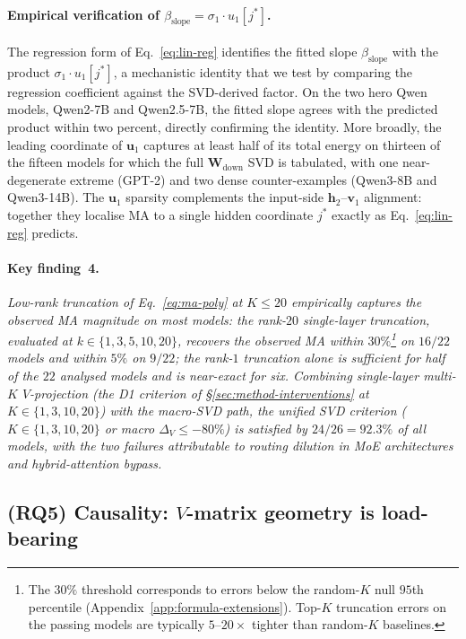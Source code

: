 \documentclass{article}
\newcommand{\Wdown}{\mathbf{W}_{\text{down}}}
\begin{document}
\paragraph{Empirical verification of $\beta_{\text{slope}} = \sigma_1 \cdot u_1[j^{*}]$.}
The regression form of Eq.~\eqref{eq:lin-reg} identifies the fitted
slope $\beta_{\text{slope}}$ with the product $\sigma_1 \cdot u_1[j^{*}]$,
a mechanistic identity that we test by comparing the regression coefficient against
the SVD-derived factor. On the two hero Qwen models, Qwen2-7B and
Qwen2.5-7B, the fitted slope agrees with the predicted product within
two percent, directly confirming the identity. More broadly, the
leading coordinate of $\mathbf{u}_1$ captures at least half of its
total energy on thirteen of the fifteen models for which the full
$\Wdown$ SVD is tabulated, with one near-degenerate extreme (GPT-2)
and two dense counter-examples (Qwen3-8B and Qwen3-14B).
The $\mathbf{u}_1$ sparsity complements the input-side
$\mathbf{h}_2$--$\mathbf{v}_1$ alignment: together they localise MA to
a single hidden coordinate $j^{*}$ exactly as Eq.~\eqref{eq:lin-reg}
predicts.

\paragraph{Key finding~4.}
\emph{Low-rank truncation of Eq.~\eqref{eq:ma-poly} at $K\leq 20$
empirically captures the observed MA magnitude on most models:
the rank-$20$ single-layer truncation, evaluated at
$k \in \{1, 3, 5, 10, 20\}$, recovers the observed MA within $30\%$\footnote{The
$30\%$ threshold corresponds to errors below the random-$K$ null
$95$th percentile (Appendix~\ref{app:formula-extensions}). Top-$K$
truncation errors on the passing models are typically $5$--$20\times$
tighter than random-$K$ baselines.} on
$16/22$ models and within $5\%$ on $9/22$; the rank-$1$ truncation alone
is sufficient for half of the $22$ analysed models and is near-exact
for six. Combining single-layer multi-$K$ $V$-projection (the D1
criterion of \S\ref{sec:method-interventions} at
$K \in \{1, 3, 10, 20\}$) with the macro-SVD path, the unified SVD
criterion ($K \in \{1, 3, 10, 20\}$ or macro $\Delta_V \leq -80\%$) is
satisfied by $24/26 = 92.3\%$ of all models, with the two failures
attributable to routing dilution in MoE architectures and
hybrid-attention bypass.}

\subsection{(RQ5) Causality: $V$-matrix geometry is load-bearing}
\label{sec:rq5}
\end{document}
